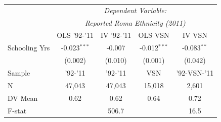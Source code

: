 \begin{tabular}[t]{lcccc}
\toprule
& \multicolumn{4}{c}{\textit{Dependent Variable: }}\\
& \multicolumn{4}{c}{\textit{Reported Roma Ethnicity (2011)} }\\
& OLS '92-'11 & IV '92-'11 & OLS VSN & IV VSN \\
\midrule
Schooling Yrs & -0.023$^{***}$ & -0.007 & -0.012$^{***}$ & -0.083$^{**}$ \\
& (0.002) & (0.010) & (0.001) & (0.042) \\
\midrule
Sample & '92-'11 & '92-'11 & VSN & '92-VSN-'11 \\
\midrule
N & 47,043 & 47,043 & 15,018 & 2,601 \\
DV Mean & 0.62 & 0.62 & 0.64 & 0.72 \\
F-stat &  & 506.7 &  & 16.5 \\
\bottomrule
\end{tabular}
